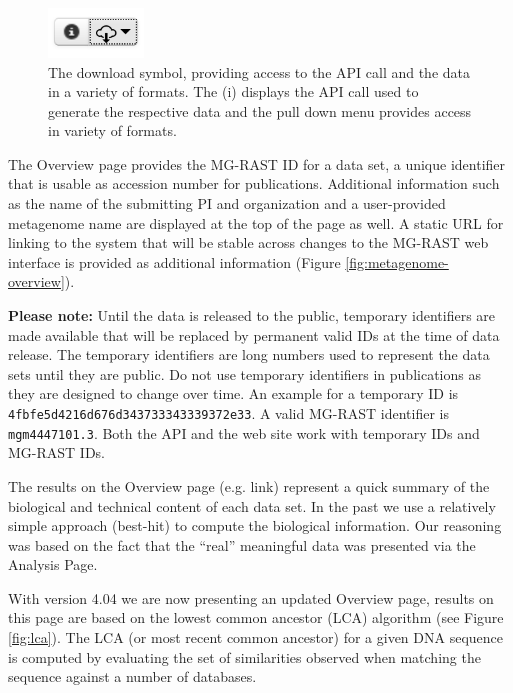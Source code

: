 \documentclass[12pt,fullpage]{report}
\begin{document}
\begin{figure}[H]
\begin{center}
\includegraphics[width=1in]{Images/download-symbol.png}
\end{center}
\caption{
The download symbol, providing access to the API call and the data in a variety of formats. The (i) displays the API call used to generate the respective data and the pull down menu provides access in variety of formats.
}
\label{fig:download-symbol}
\end{figure}


The Overview page provides the MG-RAST ID for a data set, a unique identifier that is usable as accession number for publications. Additional information such as the name of the submitting PI and organization and a user-provided metagenome name are displayed at the top of the page as well. A static URL for linking to the system that will be stable across changes to the MG-RAST web interface is provided as additional information (Figure \ref{fig:metagenome-overview}).

\textbf{Please note:} Until the data is released to the public, temporary identifiers are made available that will be replaced by permanent valid IDs at the time of data release.  The temporary identifiers are long numbers used to represent the data sets until they are public.
Do not use temporary identifiers in publications as they are designed to change over time. An example for a temporary ID is \texttt{4fbfe5d4216d676d343733343339372e33}. A valid MG-RAST identifier is \texttt{mgm4447101.3}. Both the API and the web site work with temporary IDs and MG-RAST IDs.



The results on the Overview page (e.g. link) represent a quick summary of the biological and technical
content of each data set. In the past we use a relatively simple approach (best-hit) to compute the biological
information. Our reasoning was based on the fact that the “real” meaningful data was presented via the Analysis Page.

With version 4.04 we are now presenting an updated Overview page, results on this page are based on the lowest common
ancestor (LCA) algorithm (see Figure \ref{fig:lca}). The LCA (or most recent common ancestor) for a given DNA sequence is
computed by evaluating the set of similarities observed when matching the sequence against a number
of databases.
\end{document}
